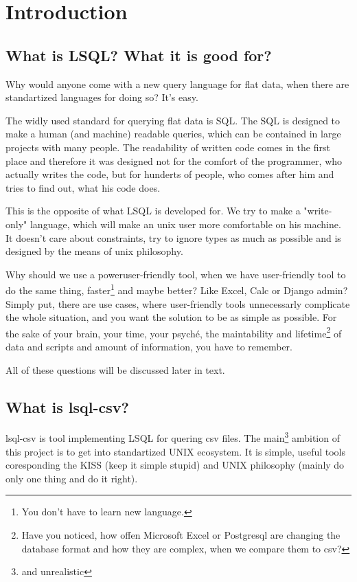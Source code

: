 \chapter{Introduction}

\section{What is LSQL? What it is good for?}

Why would anyone come with a new query language for flat data, when there are standartized languages for doing so? It's easy.

The widly used standard for querying flat data is SQL. The SQL is designed to make a human (and machine) readable queries, which can be contained in large projects with many people.
The readability of written code comes in the first place and therefore it was designed not for the comfort of the programmer, who actually writes the code, but for hunderts of people, who comes after him and tries to find out, what his code does.

This is the opposite of what LSQL is developed for. We try to make a "write-only" language, which will make an unix user more comfortable on his machine. It doesn't care about constraints, try to ignore types as much as possible and is designed by the means of unix philosophy.

Why should we use a poweruser-friendly tool, when we have user-friendly tool to do the same thing, faster\footnote{You don't have to learn new language.} and maybe better? Like Excel, Calc or Django admin?
Simply put, there are use cases, where user-friendly tools unnecessarly complicate the whole situation, and you want the solution to be as simple as possible. For the sake of your brain, your time, your psyché, the maintability and lifetime\footnote{Have you noticed, how offen Microsoft Excel or Postgresql are changing the database format and how they are complex, when we compare them to csv?} of data and scripts and amount of information, you have to remember.

All of these questions will be discussed later in text.

\section{What is lsql-csv?}
lsql-csv is tool implementing LSQL for quering csv files. The main\footnote{and unrealistic} ambition of this project is to get into standartized UNIX ecosystem. It is simple, useful tools coresponding the KISS (keep it simple stupid) and UNIX philosophy (mainly do only one thing and do it right).

